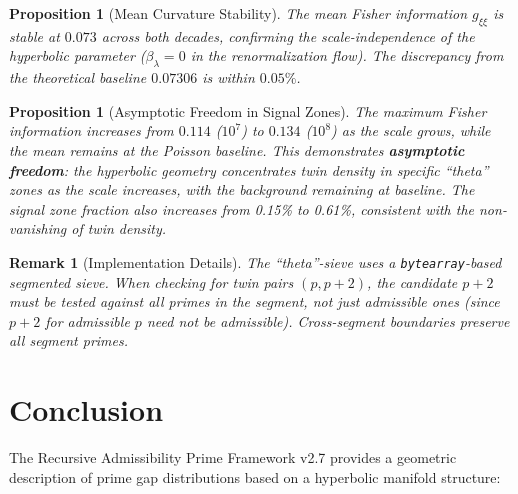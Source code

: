 \documentclass[12pt]{article}
\newtheorem{proposition}[theorem]{Proposition}
\newtheorem{remark}[theorem]{Remark}
\begin{document}
\begin{proposition}[Mean Curvature Stability]
The mean Fisher information $g_{\xi\xi}$ is stable at $0.073$ across both
decades, confirming the scale-independence of the hyperbolic parameter ($\beta_\lambda = 0$
in the renormalization flow). The discrepancy from the theoretical baseline
$0.07306$ is within $0.05\%$.
\end{proposition}

\begin{proposition}[Asymptotic Freedom in Signal Zones]
The maximum Fisher information increases from $0.114$ ($10^7$) to $0.134$ ($10^8$)
as the scale grows, while the mean remains at the Poisson baseline. This
demonstrates \textbf{asymptotic freedom}: the hyperbolic geometry concentrates
twin density in specific ``theta'' zones as the scale increases, with the
background remaining at baseline. The signal zone fraction also increases
from 0.15\% to 0.61\%, consistent with the non-vanishing of twin density.
\end{proposition}

\begin{remark}[Implementation Details]
The ``theta''-sieve uses a \texttt{bytearray}-based segmented sieve. When checking
for twin pairs $(p, p+2)$, the candidate $p+2$ must be tested against \textit{all}
primes in the segment, not just admissible ones (since $p+2$ for admissible $p$
need not be admissible). Cross-segment boundaries preserve all segment primes.
\end{remark}

\section{Conclusion}

The Recursive Admissibility Prime Framework v2.7 provides a geometric description
of prime gap distributions based on a hyperbolic manifold structure:
\end{document}
